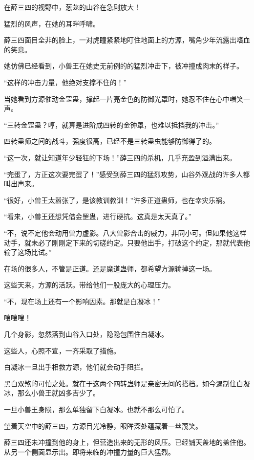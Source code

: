 
\begin{this_body}

在薛三四的视野中，葱茏的山谷在急剧放大！

猛烈的风声，在她的耳畔呼啸。

薛三四面目全非的脸上，一对虎瞳紧紧地盯住地面上的方源，嘴角少年流露出嗜血的笑意。

她仿佛已经看到，小兽王在她史无前例的的猛烈冲击下，被冲撞成肉末的样子。

“这样的冲击力量，他绝对支撑不住的！”

当她看到方源催动金罡蛊，撑起一片亮金色的防御光罩时，她忍不住在心中嗤笑一声。

“三转金罡蛊？哼，就算是进阶成四转的金钟罩，也难以抵挡我的冲击。”

四转蛊师之间的战斗，强度很高，已经不是三转蛊虫能够防御得了的。

“这一次，就让知道年少轻狂的下场！”薛三四的杀机，几乎充盈到溢满出来。

“完蛋了，方正这次要完蛋了！”感受到薛三四的猛烈攻势，山谷外观战的许多人都叫出声来。

“很好，小兽王太嚣张了，是该教训教训！”许多正道蛊师，也在幸灾乐祸。

“看来，小兽王还想凭借金罡蛊，进行硬抗。这真是太天真了。”

“不，说不定他会动用兽力虚影。八大兽影合击的威力，非同小可。但如果他这样动手，就未必了刚刚定下来的切磋约定。只要他出手，打破这个约定，那就代表他输了这场比试。”

在场的很多人，不管是正道。还是魔道蛊师，都希望方源输掉这一场。

这些天来，方源的活跃。带给他们一股庞大的心理压力。

“不，现在场上还有一个影响因素。那就是白凝冰！”

嗖嗖嗖！

几个身影，忽然落到山谷入口处，隐隐包围住白凝冰。

这些人，心照不宣，一齐采取了措施。

白凝冰一旦出手相救方源，他们就会动手阻拦。

黑白双煞的可怕之处。就在于这两个四转蛊师是亲密无间的搭档。如今遏制住白凝冰，那么小兽王就凶多吉少了。

一旦小兽王身陨，那么单独留下白凝冰。也就不那么可怕了。

望着天空中的薛三四，方源目光冷静，眼眸深处蕴藏着一丝蔑笑。

薛三四还未冲撞到他的身上，但营造出来的无形的风压。已经铺天盖地的盖住他。从另一个侧面显示出。即将来临的冲撞力量的巨大猛烈。


\end{this_body}
